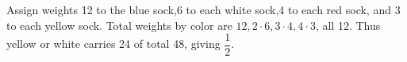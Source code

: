 Assign weights 12 to the blue sock,6 to each white sock,4 to each red sock, and 3 to each yellow sock. Total weights by color are $12,2\cdot 6,3\cdot 4,4\cdot 3$, all 12. Thus yellow or white carries 24 of total 48, giving $\boxed{\dfrac{1}{2}}$.
